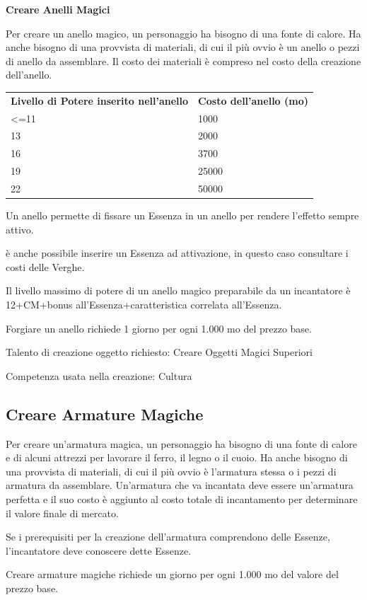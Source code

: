 \documentclass[a4paper,11pt,twoside,openany]{book}
\begin{document}
{\textbf{Creare Anelli Magici}

Per creare un anello magico, un personaggio ha bisogno di una fonte di calore. Ha anche bisogno di una provvista di materiali, di cui il più ovvio è un anello o pezzi di anello da assemblare. Il costo dei materiali è compreso nel costo della creazione dell'anello.

\bigskip

\begin{tabular}{ll}
\toprule
\textbf{Livello di Potere inserito nell'anello} & \textbf{Costo dell'anello (mo)}\tabularnewline
\textless=11 & 1000\tabularnewline
13 & 2000\tabularnewline
16 & 3700\tabularnewline
19 & 25000\tabularnewline
22 & 50000\tabularnewline
\end{tabular}

\bigskip

Un anello permette di fissare un Essenza in un anello per rendere l'effetto sempre attivo.

è anche possibile inserire un Essenza ad attivazione, in questo caso consultare i costi delle Verghe.

Il livello massimo di potere di un anello magico preparabile da un incantatore è 12+CM+bonus all'Essenza+caratteristica correlata all'Essenza.

Forgiare un anello richiede 1 giorno per ogni 1.000 mo del prezzo base.

Talento di creazione oggetto richiesto: Creare Oggetti Magici Superiori

Competenza usata nella creazione: Cultura

\subsection{Creare Armature Magiche}

Per creare un'armatura magica, un personaggio ha bisogno di una fonte di calore e di alcuni attrezzi per lavorare il ferro, il legno o il cuoio. Ha anche bisogno di una provvista di materiali, di cui il più ovvio è l'armatura stessa o i pezzi di armatura da assemblare. Un'armatura che va incantata deve essere un'armatura perfetta e il suo costo è aggiunto al costo totale di incantamento per determinare il valore finale di mercato.

Se i prerequisiti per la creazione dell'armatura comprendono delle Essenze, l'incantatore deve conoscere dette Essenze. 

Creare armature magiche richiede un giorno per ogni 1.000 mo del valore
del prezzo base.

}
\end{document}
